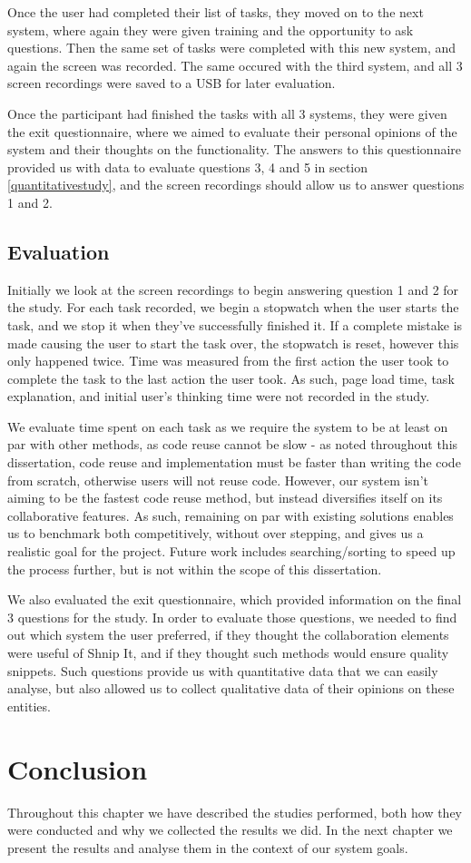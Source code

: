 Once the user had completed their list of tasks, they moved on to the next system, where again they were given training and the opportunity to ask questions.
Then the same set of tasks were completed with this new system, and again the screen was recorded.
The same occured with the third system, and all 3 screen recordings were saved to a USB for later evaluation.

Once the participant had finished the tasks with all 3 systems, they were given the exit questionnaire, where we aimed to evaluate their personal opinions of the system and their thoughts on the functionality.
The answers to this questionnaire provided us with data to evaluate questions 3, 4 and 5 in section \ref{quantitativestudy}, and the screen recordings should allow us to answer questions 1 and 2.


\subsection{Evaluation}
Initially we look at the screen recordings to begin answering question 1 and 2 for the study.
For each task recorded, we begin a stopwatch when the user starts the task, and we stop it when they've successfully finished it. 
If a complete mistake is made causing the user to start the task over, the stopwatch is reset, however this only happened twice.
Time was measured from the first action the user took to complete the task to the last action the user took.
As such, page load time, task explanation, and initial user's thinking time were not recorded in the study.

We evaluate time spent on each task as we require the system to be at least on par with other methods, as code reuse cannot be slow - as noted throughout this dissertation, code reuse and implementation must be faster than writing the code from scratch, otherwise users will not reuse code.
However, our system isn't aiming to be the fastest code reuse method, but instead diversifies itself on its collaborative features.
As such, remaining on par with existing solutions enables us to benchmark both competitively, without over stepping, and gives us a realistic goal for the project.
Future work includes searching/sorting to speed up the process further, but is not within the scope of this dissertation.

We also evaluated the exit questionnaire, which provided information on the final 3 questions for the study.
In order to evaluate those questions, we needed to find out which system the user preferred, if they thought the collaboration elements were useful of Shnip It, and if they thought such methods would ensure quality snippets.
Such questions provide us with quantitative data that we can easily analyse, but also allowed us to collect qualitative data of their opinions on these entities.

\section{Conclusion}
Throughout this chapter we have described the studies performed, both how they were conducted and why we collected the results we did. 
In the next chapter we present the results and analyse them in the context of our system goals.




